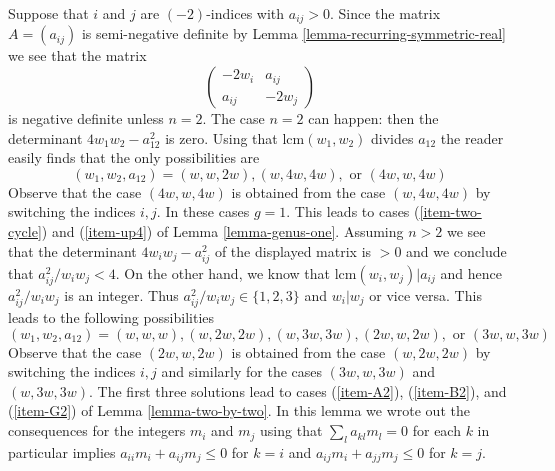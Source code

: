 \medskip\noindent
Suppose that $i$ and $j$ are $(-2)$-indices with $a_{ij} > 0$.
Since the matrix $A = (a_{ij})$ is semi-negative definite by
Lemma \ref{lemma-recurring-symmetric-real} we see that the matrix
$$
\left(
\begin{matrix}
-2w_i & a_{ij} \\
a_{ij} & -2w_j
\end{matrix}
\right)
$$
is negative definite unless $n = 2$. The case $n = 2$ can happen: then
the determinant $4w_1w_2 - a_{12}^2$ is zero. Using that
$\text{lcm}(w_1, w_2)$ divides $a_{12}$ the reader easily finds
that the only possibilities are
$$
(w_1, w_2, a_{12}) = (w, w, 2w), (w, 4w, 4w), \text{ or }(4w, w, 4w)
$$
Observe that the case $(4w, w, 4w)$ is obtained from the case
$(w, 4w, 4w)$ by switching the indices $i, j$.
In these cases $g = 1$. This leads to cases
(\ref{item-two-cycle}) and (\ref{item-up4}) of Lemma \ref{lemma-genus-one}.
Assuming $n > 2$ we see
that the determinant $4w_iw_j - a_{ij}^2$ of the displayed matrix
is $> 0$ and we conclude that $a_{ij}^2/w_iw_j < 4$.
On the other hand, we know that $\text{lcm}(w_i, w_j) | a_{ij}$
and hence $a_{ij}^2/w_iw_j$ is an integer.
Thus $a_{ij}^2/w_iw_j \in \{1, 2, 3\}$ and $w_i | w_j$ or
vice versa. This leads to the following possibilities
$$
(w_1, w_2, a_{12}) = (w, w, w), (w, 2w, 2w), (w, 3w, 3w),
(2w, w, 2w), \text{ or }(3w, w, 3w)
$$
Observe that the case $(2w, w, 2w)$ is obtained from the case
$(w, 2w, 2w)$ by switching the indices $i, j$ and similarly
for the cases $(3w, w, 3w)$ and $(w, 3w, 3w)$. The first three
solutions lead to cases (\ref{item-A2}), (\ref{item-B2}), and
(\ref{item-G2}) of Lemma \ref{lemma-two-by-two}. In this lemma
we wrote out the consequences for the integers $m_i$ and $m_j$
using that $\sum_l a_{kl}m_l = 0$ for each $k$ in particular implies
$a_{ii}m_i + a_{ij}m_j \leq 0$ for $k = i$ and
$a_{ij}m_i + a_{jj}m_j \leq 0$ for $k = j$.

